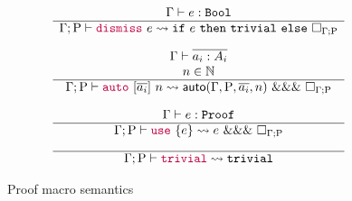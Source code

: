 \begin{figure*}
{\[\begin{array}{c}
\\[1em]
  \Gamma \vdash e:\mathtt{Bool} \\
  \hline
  \Gamma; \mathrm{P}
  \vdash
  {\color{purple}\ensuremath{\mathtt{dismiss}}} ~ e
  \rightsquigarrow
  \mathtt{if} ~ e ~ \mathtt{then} ~ \mathtt{trivial} ~ \mathtt{else} ~ \Box_{\Gamma ; \mathrm{P}}
\\[1em]
  \Gamma \vdash \overline{a_i:A_i} \\
  n \in \mathbb{N} \\
  \hline 
  \Gamma; \mathrm{P}
  \vdash 
  {\color{purple}\ensuremath{\mathtt{auto}}} ~ [\overline{a_i}] ~ n
  \rightsquigarrow
  \mathsf{auto}(\Gamma, \mathrm{P}, \overline{a_i}, n) ~ \mathtt{\&\&\&} ~ \Box_{\Gamma ; \mathrm{P}}
\\[1em]
  \Gamma \vdash e : \mathtt{Proof} \\
  \hline
  \Gamma; \mathrm{P}
  \vdash 
  {\color{purple}\ensuremath{\mathtt{use}}} ~ \{ e \} 
  \rightsquigarrow
  e ~ \mathtt{\&\&\&} ~ \Box_{\Gamma ; \mathrm{P}}
\\[1em]
  \hline
  \Gamma; \mathrm{P}
  \vdash
  {\color{purple}\ensuremath{\mathtt{trivial}}}
  \rightsquigarrow
  \mathtt{trivial}
\end{array}
\]
}
\caption{Proof macro semantics}
\label{fig:proof-macro-semantics}
\end{figure*}

